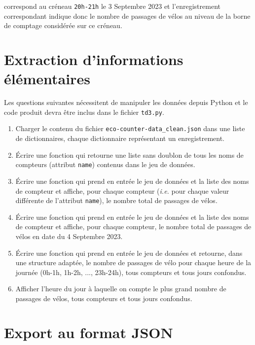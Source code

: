 \documentclass[11pt,a4paper]{article}
\begin{document}
\noindent
correspond au créneau \verb+20h-21h+ le 3 Septembre 2023 et l'enregistrement correspondant indique donc le nombre de passages de vélos au niveau de la borne de comptage considérée sur ce créneau.

\section{Extraction d'informations élémentaires}

Les questions suivantes nécessitent de manipuler les données depuis Python et le code produit devra être inclus dans le fichier \verb+td3.py+.

\begin{enumerate}
\item Charger le contenu du fichier \verb+eco-counter-data_clean.json+ dans une liste de dictionnaires, chaque dictionnaire représentant un enregistrement.

\item Écrire une fonction qui retourne une liste sans doublon de tous les noms de compteurs (attribut \verb+name+) contenus dans le jeu de données.

\item Écrire une fonction qui prend en entrée le jeu de données et la liste des noms de compteur et affiche, pour chaque compteur (\emph{i.e.} pour chaque valeur différente de l'attribut \verb+name+), le nombre total de passages de vélos.

\item Écrire une fonction qui prend en entrée le jeu de données et la liste des noms de compteur et affiche, pour chaque compteur, le nombre total de passages de vélos en date du 4 Septembre 2023.

\item Écrire une fonction qui prend en entrée le jeu de données et retourne, dans une structure adaptée, le nombre de passages de vélo pour chaque heure de la journée (0h-1h, 1h-2h, ..., 23h-24h), tous compteurs et tous jours confondus.

\item Afficher l'heure du jour à laquelle on compte le plus grand nombre de passages de vélos, tous compteurs et tous jours confondus.
\end{enumerate}

\section{Export au format JSON}
\end{document}
